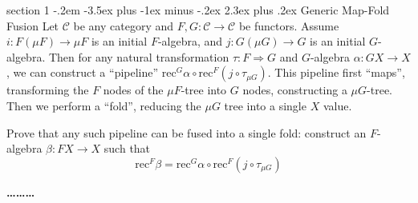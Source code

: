 \documentclass[12pt]{article}
\makeatletter
\newenvironment{problem}{\@startsection
       {section}
       {1}
       {-.2em}
       {-3.5ex plus -1ex minus -.2ex}
       {2.3ex plus .2ex}
       {\pagebreak[3]%
       \large\bf\noindent{Problem }
       }
       }
       {%
       \begin{center}\large\bf \ldots\ldots\ldots\end{center}}
\newcommand{\cat}{\mathcal}
\makeatother
\begin{document}
\begin{problem}{Generic Map-Fold Fusion}
  Let $\cat C$ be any category and $F, G : \cat C \to \cat C$ be
  functors.  Assume $i : F(\mu F) \to \mu F$ is an initial
  $F$-algebra, and $j : G(\mu G) \to G$ is an initial
  $G$-algebra. Then for any natural transformation $\tau : F
  \Rightarrow G$ and $G$-algebra $\alpha : G X \to X$, we can
  construct a ``pipeline'' $\textrm{rec}^G\alpha \circ \textrm{rec}^F
  (j \circ \tau_{\mu G})$. This pipeline first ``maps'', transforming
  the $F$ nodes of the $\mu F$-tree into $G$ nodes, constructing a
  $\mu G$-tree. Then we perform a ``fold'', reducing the $\mu G$ tree
  into a single $X$ value. 

  Prove that any such pipeline can be fused into a single fold:
  construct an $F$-algebra $\beta : FX \to X$ such that
  \[ \textrm{rec}^F \beta = \textrm{rec}^G\alpha \circ \textrm{rec}^F (j \circ \tau_{\mu G})\]
\end{problem}
\end{document}

